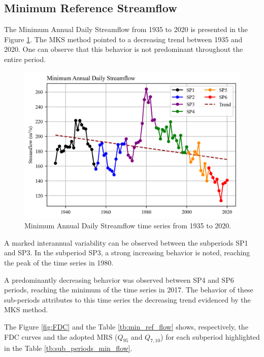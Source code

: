      \subsection{Minimum Reference Streamflow}
        The Minimum Annual Daily Streamflow from 1935 to 2020 is presented in the Figure \ref{fig:Q_min}. The MKS method pointed to a decreasing trend between 1935 and 2020. One can observe that this behavior is not predominant throughout the entire period.
        
        \begin{figure}
            \centering
                \includegraphics[scale = 1]{
                figs/Q_min_anual.png
                }
            \caption{
                Minimum Annual Daily Streamflow time series from 1935 to 2020. 
            }
            \label{fig:Q_min}
        \end{figure}
        
        A marked interannual variability can be observed between the subperiods SP1 and SP3. In the subperiod SP3, a strong increasing behavior is noted, reaching the peak of the time series in 1980. 
        
        A predominantly decreasing behavior was observed between SP4 and SP6 periods, reaching the minimum of the time series in 2017. The behavior of these sub-periods attributes to this time series the decreasing trend evidenced by the MKS method.

        The Figure \ref{fig:FDC} and the Table \ref{tb:min_ref_flow} shows, respectively, the FDC curves and the adopted MRS ($Q_{95}$ and $Q_{7,10}$) for each subperiod highlighted in the Table \ref{tb:sub_periods_min_flow}. 

